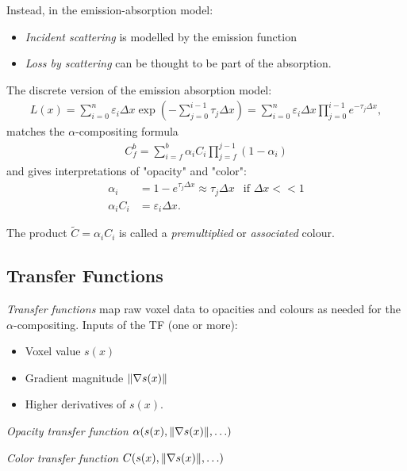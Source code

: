 Instead, in the emission-absorption model:
\begin{itemize}
\item \emph{Incident scattering} is modelled by the emission function
\item \emph{Loss by scattering} can be thought to be part of the absorption.
\end{itemize}


The discrete version of the emission absorption model:
\begin{align*}
    L(x) = \sum_{i=0}^n \varepsilon_i \Delta x \exp\left( -\sum_{j=0}^{i-1} \tau_j \Delta x \right) 
    = \sum_{i=0}^n \varepsilon_i \Delta x\prod_{j=0}^{i-1} e^{- \tau_j \Delta x},
\end{align*}
matches the $\alpha$-compositing formula
\begin{align*}
    C_f^b = \sum_{i=f}^b \alpha_i C_i \prod_{j=f}^{j-1} (1-\alpha_i)
\end{align*}
and gives interpretations of "opacity" and "color":
\begin{align*}
    \alpha_i &= 1-e^{\tau_j\Delta x} \approx \tau_j \Delta x &\text{if }\Delta x << 1\\
    \alpha_i C_i &= \varepsilon_i \Delta x.
\end{align*}

The product $\tilde C = \alpha_i C_i$ is called a \emph{premultiplied} or \emph{associated} colour.

\subsection{Transfer Functions}
\emph{Transfer functions} map raw voxel data to opacities and colours as needed for the $\alpha$-compositing. Inputs of the TF (one or more):
\begin{itemize}
    \item Voxel value $s(x)$
    \item Gradient magnitude $\left\lVert\nabla s(x)\right\rVert$
    \item Higher derivatives of $s(x)$.
\end{itemize}

\begin{description}
\item \emph{Opacity transfer function} $\alpha(s(x), \norm{\nabla s(x)}, \ldots)$
\item \emph{Color transfer function} $C(s(x), \norm{\nabla s(x)}, \ldots)$
\end{description}

